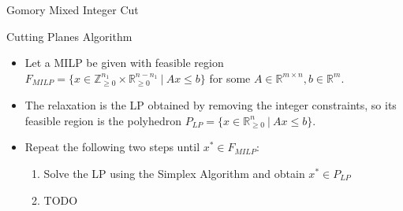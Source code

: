 \begin{frame}{Gomory Mixed Integer Cut}



\end{frame}

\begin{frame}{Cutting Planes Algorithm}
\begin{itemize}
\item Let a MILP be given with feasible region $F_{MILP} = \{x \in \mathbb{Z}_{\geq 0}^{n_1} \times \mathbb{R}_{\geq 0}^{n-n_1} \:\vert\: Ax \leq b \}$ for some $A \in \mathbb{R}^{m \times n}, b \in \mathbb{R}^m$.
\item The relaxation is the LP obtained by removing the integer constraints, so its feasible region is the polyhedron $P_{LP} = \{x \in \mathbb{R}_{\geq 0}^{n} \:\vert\: Ax \leq b \}$.
\item Repeat the following two steps until $x^* \in F_{MILP}$:
\begin{enumerate}
\item Solve the LP using the Simplex Algorithm and obtain $x^* \in P_{LP}$
\item TODO %
\end{enumerate}
\end{itemize}
\end{frame}

